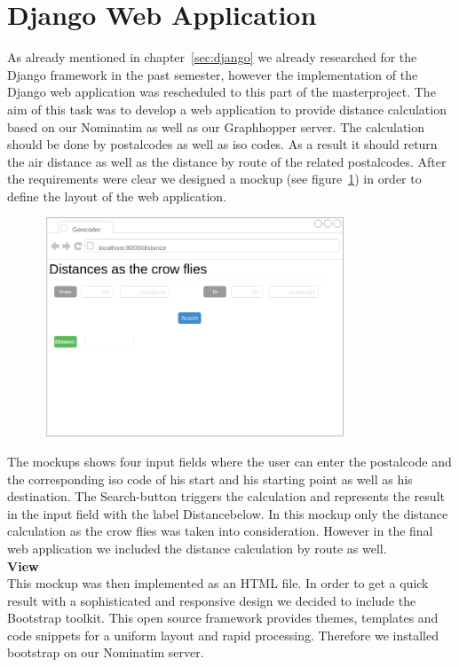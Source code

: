 
\section{Django Web Application}

As already mentioned in chapter~\ref{sec:django} we already researched for the Django framework in the past semester, however the implementation of the Django web application was rescheduled to this part of the masterproject.
The aim of this task was to develop a web application to provide distance calculation based on our Nominatim as well as our Graphhopper server. The calculation should be done by postalcodes as well as iso codes. As a result it should return the air distance as well as the distance by route of the related postalcodes. After the requirements were clear we designed a mockup (see figure~\ref{fig:mockup}) in order to define the layout of the web application. 
\begin{figure}[H]
\centering
\includegraphics[width=0.8\textwidth]{img/mockup}
\label{fig:mockup}
\end{figure}
The mockups shows four input fields where the user can enter the postalcode and the corresponding iso code of his start and his starting point as well as his destination. The \glqq Search\grqq-button triggers the calculation and represents the result in the input field with the label \glqq Distance\grqq below. In this mockup only the distance calculation as the crow flies was taken into consideration. However in the final web application we included the distance calculation by route as well.\\
\textbf{View}\\
This mockup was then implemented as an HTML file. In order to get a quick result with a sophisticated and responsive design we decided to include the Bootstrap toolkit. This open source framework provides themes, templates and code snippets for a uniform layout and rapid processing. Therefore we installed bootstrap on our Nominatim server. 
